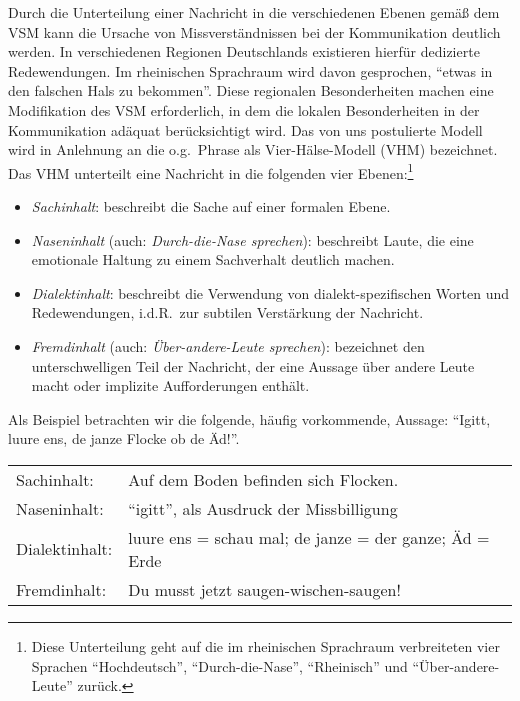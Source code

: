 \documentclass[11pt,DIV16,twocolumn]{scrartcl}
\begin{document}
Durch die Unterteilung einer Nachricht in die verschiedenen Ebenen
gemäß dem VSM kann die Ursache von Missverständnissen bei der
Kommunikation deutlich werden.  In verschiedenen Regionen Deutschlands
existieren hierfür dedizierte Redewendungen.  Im rheinischen
Sprachraum wird davon gesprochen, "`etwas in den falschen Hals zu
bekommen"'.  Diese regionalen Besonderheiten machen eine Modifikation
des VSM erforderlich, in dem die lokalen Besonderheiten in der
Kommunikation adäquat berücksichtigt wird.  Das von uns postulierte
Modell wird in Anlehnung an die o.g.\ Phrase als Vier-Hälse-Modell
(VHM) bezeichnet.  Das VHM unterteilt eine Nachricht in die folgenden
vier Ebenen:\footnote{Diese Unterteilung geht auf die im rheinischen
  Sprachraum verbreiteten vier Sprachen "`Hochdeutsch"',
  "`Durch-die-Nase"', "`Rheinisch"' und "`Über-andere-Leute"' zurück.}
%
\begin{itemize}
\item \textit{Sachinhalt}: beschreibt die Sache auf einer formalen
  Ebene.
\item \textit{Naseninhalt} (auch: \textit{Durch-die-Nase sprechen}):
  beschreibt Laute, die eine emotionale Haltung zu einem Sachverhalt
  deutlich machen.
\item \textit{Dialektinhalt}: beschreibt die Verwendung von
  dialekt-spezifischen Worten und Redewendungen, i.d.R.\ zur subtilen
  Verstärkung der Nachricht.%
\item \textit{Fremdinhalt} (auch: \textit{Über-andere-Leute
    sprechen}): bezeichnet den unterschwelligen Teil der Nachricht,
  der eine Aussage über andere Leute macht oder implizite
  Aufforderungen enthält.%
\end{itemize}
%
Als Beispiel betrachten wir die folgende, häufig vorkommende, Aussage:
"`Igitt, luure ens, de janze Flocke ob de Äd!"'.
%
\begin{center}
  \begin{tabularx}{\linewidth}{lX}
    Sachinhalt: & Auf dem Boden befinden sich Flocken. \\
    Naseninhalt: & "`igitt"', als Ausdruck der Missbilligung \\
    Dialektinhalt: & luure ens = schau mal; de janze = der ganze; Äd = Erde \\
    Fremdinhalt: & Du musst jetzt saugen-wischen-saugen!
  \end{tabularx}
\end{center}
\end{document}
